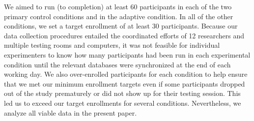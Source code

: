 \documentclass[11pt]{article}
\begin{document}
We aimed to run (to completion) at least 60 participants in each of the two
primary control conditions and in the adaptive condition. In all of the other
conditions, we set a target enrollment of at least 30 participants. Because our
data collection procedures entailed the coordinated efforts of 12 researchers
and multiple testing rooms and computers, it was not feasible for individual
experimenters to know how many participants had been run in each experimental
condition until the relevant databases were synchronized at the end of each
working day. We also over-enrolled participants for each condition to help
ensure that we met our minimum enrollment targets even if some participants
dropped out of the study prematurely or did not show up for their testing
session. This led us to exceed our target enrollments for several conditions.
Nevertheless, we analyze all viable data in the present paper.
\end{document}
